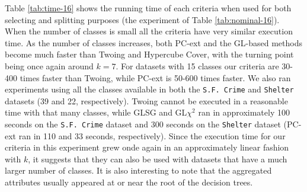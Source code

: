 Table \ref{tab:time-16} shows the running time of each criteria when used for both selecting and splitting purposes (the experiment of Table \ref{tab:nominal-16}).
When the number of classes is small all the criteria have very similar execution time. As the number of classes increases, both PC-ext and the GL-based methods become much faster than Twoing and Hypercube Cover, with the turning point being once again around $k=7$. For datasets with 15 classes our criteria are 30-400 times faster than Twoing, while PC-ext is 50-600 times faster. We also ran experiments using all the classes available in both the {\tt S.F. Crime} and {\tt Shelter} datasets (39 and 22, respectively). Twoing cannot be executed in a reasonable time with that many classes, while GLSG and GL$\chi^2$ ran in approximately 100 seconds on the {\tt S.F. Crime} dataset and  300 seconds on the {\tt Shelter} dataset (PC-ext ran in 110 and 33 seconds, respectively). Since the execution time for our criteria in this experiment grew onde again in an approximately linear fashion with $k$, it suggests that they can also be used with datasets that have a much larger number of classes. It is also interesting to note that the aggregated attributes usually appeared at or near the root of the decision trees.

